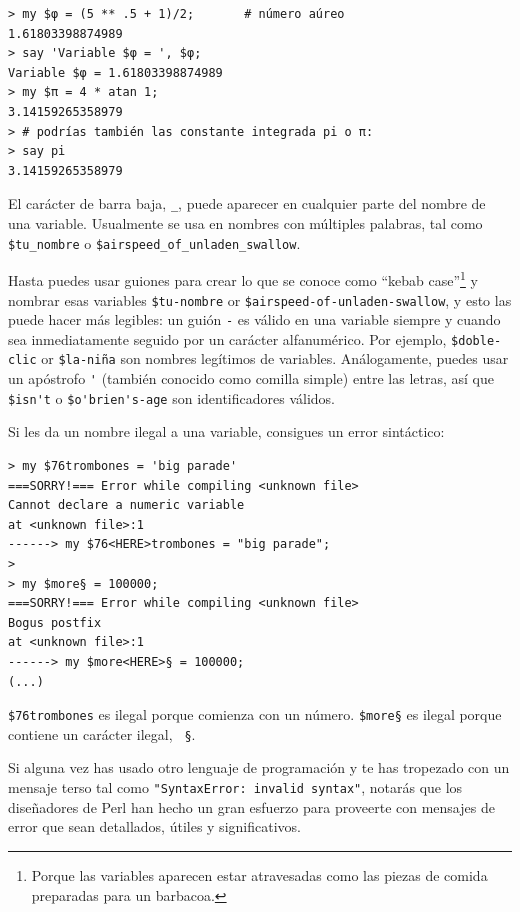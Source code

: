 \begin{verbatim}
> my $φ = (5 ** .5 + 1)/2;       # número aúreo
1.61803398874989
> say 'Variable $φ = ', $φ;
Variable $φ = 1.61803398874989
> my $π = 4 * atan 1; 
3.14159265358979
> # podrías también las constante integrada pi o π:
> say pi
3.14159265358979
\end{verbatim}

El carácter de barra baja, \verb"_", puede aparecer en cualquier
parte del nombre de una variable. Usualmente se usa en nombres con
múltiples palabras, tal como \verb"$tu_nombre" o \verb"$airspeed_of_unladen_swallow". 

Hasta puedes usar guiones para crear lo que se conoce como
``kebab case''\footnote{Porque las variables aparecen estar
atravesadas como las piezas de comida preparadas para un barbacoa.}
y nombrar esas variables \verb"$tu-nombre" or \verb"$airspeed-of-unladen-swallow",
y esto las puede hacer más legibles: un guión \verb'-' es válido en una variable
siempre y cuando sea inmediatamente seguido por un carácter alfanumérico.
Por ejemplo, \verb"$doble-clic" or \verb"$la-niña" son nombres legítimos
de variables. Análogamente, puedes usar un apóstrofo \verb"'" 
(también conocido como comilla simple) entre las letras, así que 
\verb"$isn't" o \verb"$o'brien's-age" son identificadores válidos. 


Si les da un nombre ilegal a una variable, consigues 
un error sintáctico:

\begin{verbatim}
> my $76trombones = 'big parade'
===SORRY!=== Error while compiling <unknown file>
Cannot declare a numeric variable
at <unknown file>:1
------> my $76<HERE>trombones = "big parade";
>
> my $more§ = 100000;
===SORRY!=== Error while compiling <unknown file>
Bogus postfix
at <unknown file>:1
------> my $more<HERE>§ = 100000;
(...)
\end{verbatim}
%
{\tt \$76trombones} es ilegal porque comienza con un número.
{\tt \$more§} es ilegal porque contiene un carácter ilegal, {\tt
§}. 

Si alguna vez has usado otro lenguaje de programación y 
te has tropezado con un mensaje terso tal como {\tt"SyntaxError: invalid syntax"},
notarás que los diseñadores de Perl han hecho un gran esfuerzo
para proveerte con mensajes de error que sean detallados, útiles
y significativos.

